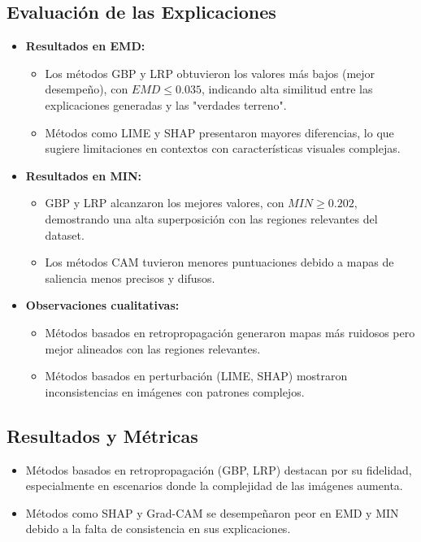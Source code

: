 \documentclass{report}
\begin{document}
\subsection{Evaluación de las Explicaciones}
\begin{itemize}
    \item \textbf{Resultados en EMD:} 
    \begin{itemize}
        \item Los métodos GBP y LRP obtuvieron los valores más bajos (mejor desempeño), con \(EMD \leq 0.035\), indicando alta similitud entre las explicaciones generadas y las "verdades terreno".
        \item Métodos como LIME y SHAP presentaron mayores diferencias, lo que sugiere limitaciones en contextos con características visuales complejas.
    \end{itemize}
    \item \textbf{Resultados en MIN:}
    \begin{itemize}
        \item GBP y LRP alcanzaron los mejores valores, con \(MIN \geq 0.202\), demostrando una alta superposición con las regiones relevantes del dataset.
        \item Los métodos CAM tuvieron menores puntuaciones debido a mapas de saliencia menos precisos y difusos.
    \end{itemize}
    \item \textbf{Observaciones cualitativas:}
    \begin{itemize}
        \item Métodos basados en retropropagación generaron mapas más ruidosos pero mejor alineados con las regiones relevantes.
        \item Métodos basados en perturbación (LIME, SHAP) mostraron inconsistencias en imágenes con patrones complejos.
    \end{itemize}
\end{itemize}

\subsection{Resultados y Métricas}
\begin{itemize}
    \item Métodos basados en retropropagación (GBP, LRP) destacan por su fidelidad, especialmente en escenarios donde la complejidad de las imágenes aumenta.
    \item Métodos como SHAP y Grad-CAM se desempeñaron peor en EMD y MIN debido a la falta de consistencia en sus explicaciones.
\end{itemize}
\end{document}
